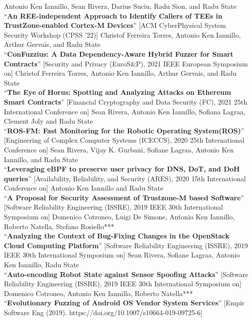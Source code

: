 \documentclass[margin,line]{resume}
\begin{document}
\begin{resume}
\filbreak
Antonio Ken Iannillo, Sean Rivera, Darius Suciu, Radu Sion, and Radu State\\
``\textbf{An REE-independent Approach to Identify Callers of TEEs in TrustZone-enabled Cortex-M Devices}''
[ACM CyberPhysical System Security Workshop (CPSS ’22)]
\filbreak
Christof Ferreira Torres, Antonio Ken Iannillo, Arthur Gervais, and Radu State\\
``\textbf{ConFuzzius: A Data Dependency-Aware Hybrid Fuzzer for Smart Contracts}''
[Security and Privacy (EuroS\&P), 2021 IEEE European Symposium on]
\filbreak
Christof Ferreira Torres, Antonio Ken Iannillo, Arthur Gervais, and Radu State\\
``\textbf{The Eye of Horus: Spotting and Analyzing Attacks on Ethereum Smart Contracts}''
[Financial Cryptography and Data Security (FC), 2021 25th International Conference on]
\filbreak
Sean Rivera, Antonio Ken Iannillo, Sofiana Lagraa, Clement Joly and Radu State\\
``\textbf{ROS-FM: Fast Monitoring for the Robotic Operating System(ROS)}''
[Engineering of Complex Computer Systems (ICECCS), 2020 25th International Conference on]
\filbreak
Sean Rivera, Vijay K. Gurbani, Sofiane Lagraa, Antonio Ken Iannillo, and Radu State\\
``\textbf{Leveraging eBPF to preserve user privacy for DNS, DoT, and DoH queries}''
[Availability, Reliability, and Security (ARES), 2020 15th International Conference on]
\filbreak
Antonio Ken Iannillo and Radu State\\
``\textbf{A Proposal for Security Assessment of Trustzone-M based Software}''
[Software Reliability Engineering (ISSRE), 2019 IEEE 30th International Symposium on]
\filbreak
Domenico Cotroneo, Luigi De Simone, Antonio Ken Iannillo, Roberto Natella, Stefano Rosiello***\\
``\textbf{Analyzing the Context of Bug-Fixing Changes in the OpenStack Cloud Computing Platform}''
[Software Reliability Engineering (ISSRE), 2019 IEEE 30th International Symposium on]
\filbreak
Sean Rivera, Sofiane Lagraa, Antonio Ken Iannillo, Radu State\\
``\textbf{Auto-encoding Robot State against Sensor Spoofing Attacks}''
[Software Reliability Engineering (ISSRE), 2019 IEEE 30th International Symposium on]
\filbreak
Domenico Cotroneo, Antonio Ken Iannillo, Roberto Natella***\\
``\textbf{Evolutionary Fuzzing of Android OS Vendor System Services}''
[Empir Software Eng (2019). https://doi.org/10.1007/s10664-019-09725-6]
\filbreak

\end{resume}
\end{document}
